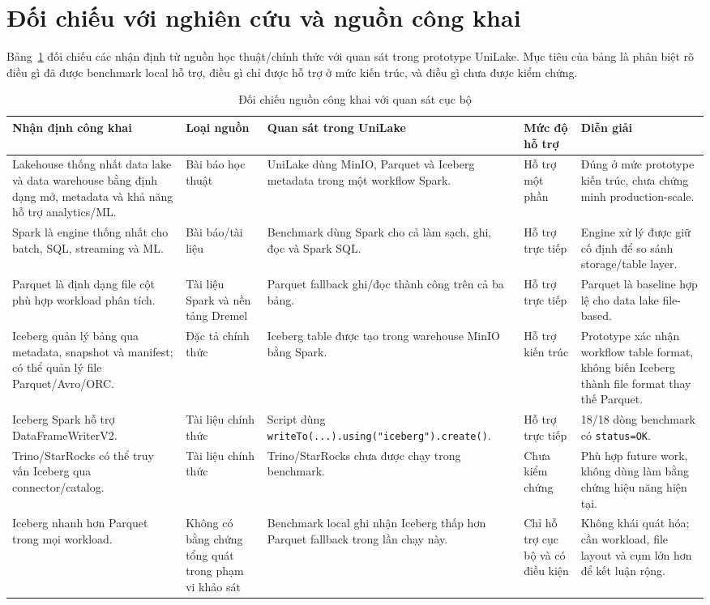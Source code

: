 \section{Đối chiếu với nghiên cứu và nguồn công khai}

Bảng~\ref{tab:public-validation} đối chiếu các nhận định từ nguồn học thuật/chính thức với quan sát trong prototype UniLake. Mục tiêu của bảng là phân biệt rõ điều gì đã được benchmark local hỗ trợ, điều gì chỉ được hỗ trợ ở mức kiến trúc, và điều gì chưa được kiểm chứng.

\begin{table}[htbp]
\centering
\caption{Đối chiếu nguồn công khai với quan sát cục bộ}
\label{tab:public-validation}
\begin{tabularx}{\textwidth}{X p{} X p{} X}
\toprule
Nhận định công khai & Loại nguồn & Quan sát trong UniLake & Mức độ hỗ trợ & Diễn giải \\
\midrule
Lakehouse thống nhất data lake và data warehouse bằng định dạng mở, metadata và khả năng hỗ trợ analytics/ML. & Bài báo học thuật~\cite{lakehousePaper} & UniLake dùng MinIO, Parquet và Iceberg metadata trong một workflow Spark. & Hỗ trợ một phần & Đúng ở mức prototype kiến trúc, chưa chứng minh production-scale. \\
Spark là engine thống nhất cho batch, SQL, streaming và ML. & Bài báo/tài liệu~\cite{sparkCacm,sparkParquetDocs} & Benchmark dùng Spark cho cả làm sạch, ghi, đọc và Spark SQL. & Hỗ trợ trực tiếp & Engine xử lý được giữ cố định để so sánh storage/table layer. \\
Parquet là định dạng file cột phù hợp workload phân tích. & Tài liệu Spark và nền tảng Dremel~\cite{sparkParquetDocs,dremelPaper} & Parquet fallback ghi/đọc thành công trên cả ba bảng. & Hỗ trợ trực tiếp & Parquet là baseline hợp lệ cho data lake file-based. \\
Iceberg quản lý bảng qua metadata, snapshot và manifest; có thể quản lý file Parquet/Avro/ORC. & Đặc tả chính thức~\cite{icebergSpec} & Iceberg table được tạo trong warehouse MinIO bằng Spark. & Hỗ trợ kiến trúc & Prototype xác nhận workflow table format, không biến Iceberg thành file format thay thế Parquet. \\
Iceberg Spark hỗ trợ DataFrameWriterV2. & Tài liệu chính thức~\cite{icebergSparkWrites} & Script dùng \texttt{writeTo(...).using("iceberg").create()}. & Hỗ trợ trực tiếp & 18/18 dòng benchmark có \texttt{status=OK}. \\
Trino/StarRocks có thể truy vấn Iceberg qua connector/catalog. & Tài liệu chính thức~\cite{trinoIcebergDocs,starrocksIcebergDocs} & Trino/StarRocks chưa được chạy trong benchmark. & Chưa kiểm chứng & Phù hợp future work, không dùng làm bằng chứng hiệu năng hiện tại. \\
Iceberg nhanh hơn Parquet trong mọi workload. & Không có bằng chứng tổng quát trong phạm vi khảo sát & Benchmark local ghi nhận Iceberg thấp hơn Parquet fallback trong lần chạy này. & Chỉ hỗ trợ cục bộ và có điều kiện & Không khái quát hóa; cần workload, file layout và cụm lớn hơn để kết luận rộng. \\
\bottomrule
\end{tabularx}
\end{table}

